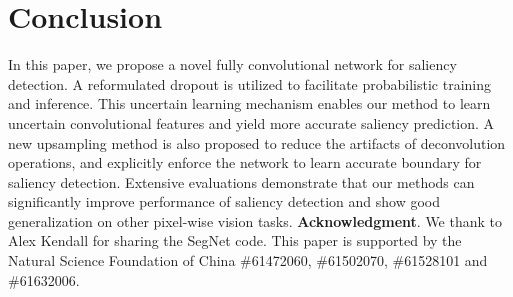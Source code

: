 \documentclass[10pt,twocolumn,letterpaper]{article}
\begin{document}
\section{Conclusion}
\vspace{-1mm}
In this paper, we propose a novel fully convolutional network for saliency detection.
A reformulated dropout is utilized to facilitate probabilistic training and inference.
This uncertain learning mechanism enables our method to learn uncertain convolutional features and yield more accurate saliency prediction.
A new upsampling method is also proposed to reduce the artifacts of deconvolution operations, and explicitly enforce the network to learn accurate boundary for saliency detection.
Extensive evaluations demonstrate that our methods can significantly improve performance of saliency detection and show good generalization on other pixel-wise vision tasks.
\vspace{-3mm}
{\small {\flushleft\textbf{Acknowledgment}}.
We thank to Alex Kendall for sharing the SegNet code.
This paper is supported by the Natural Science Foundation of China \#61472060, \#61502070, \#61528101 and \#61632006.}
\vspace{-5mm}
{\small


}
\end{document}
